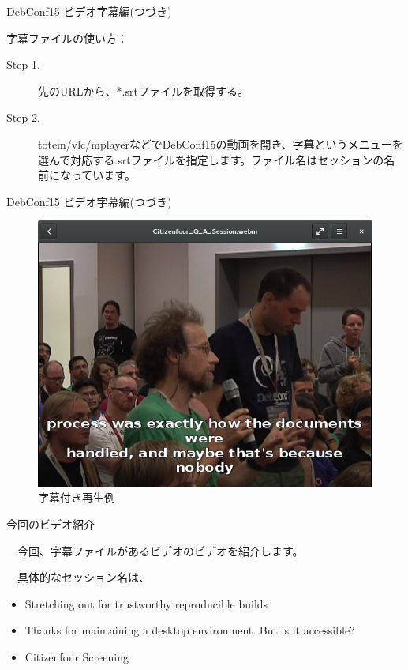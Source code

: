 \begin{frame}{DebConf15 ビデオ字幕編(つづき)}

  字幕ファイルの使い方：
  \begin{description}
\item [Step 1.] 先のURLから、*.srtファイルを取得する。
\item [Step 2.] totem/vlc/mplayerなどでDebConf15の動画を開き、字幕というメニューを選んで対応する.srtファイルを指定します。ファイル名はセッションの名前になっています。
  \end{description}    
  
\end{frame}

\begin{frame}{DebConf15 ビデオ字幕編(つづき)}

\begin{figure}[H]
\begin{center}
\includegraphics[width=0.8\hsize]{image201510/subtitle.png}
\end{center}
\caption{字幕付き再生例}
\end{figure}
\end{frame}

\begin{frame}{今回のビデオ紹介}

  　今回、字幕ファイルがあるビデオのビデオを紹介します。

  　具体的なセッション名は、
  \begin{itemize}
\item Stretching out for trustworthy reproducible builds
\item Thanks for maintaining a desktop environment. But is it accessible?
\item Citizenfour Screening
  \end{itemize}

\end{frame}

